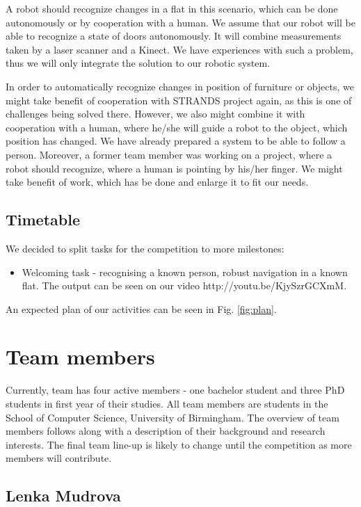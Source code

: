 \documentclass[conference]{IEEEtran}
\begin{document}
A robot should recognize changes in a flat in this scenario, which can be done autonomously or by cooperation with a human. We assume that our robot will be able to recognize a state of doors autonomously. It will combine measurements taken by a laser scanner and a Kinect. We have experiences with such a problem, thus we will only integrate the solution to our robotic system. 

In order to automatically recognize changes in position of furniture or objects, we might take benefit of cooperation with STRANDS project again, as this is one of challenges being solved there. However, we also might combine it with cooperation with a human, where he/she will guide a robot to the object, which position has changed. We have already prepared a system to be able to follow a person. Moreover, a former team member was working on a project, where a robot should recognize, where a human is pointing by his/her finger. We might take benefit of work, which has be done and enlarge it to fit our needs. 

\subsection{Timetable}
We decided to split tasks for the competition to more milestones:
\begin{itemize}
\item Welcoming task - recognising a known person, robust navigation in a known flat. The output can be seen on our video \textsf{http://youtu.be/KjySzrGCXmM}.
\end{itemize}
An expected plan of our activities can be seen in Fig. \ref{fig:plan}.


\section{Team members}

Currently, team has four active members - one bachelor student and three PhD students in first year of their studies. All team members are students in the School of Computer Science, University of Birmingham. The overview of team members follows along with a description of their background and research interests. The final team line-up is likely to change until the competition as more members will contribute.

\subsection{Lenka Mudrova}
\end{document}
